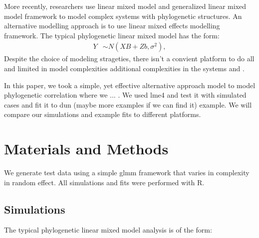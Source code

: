\documentclass[12pt]{article}
\begin{document}
More recently, researchers use linear mixed model and generalized linear mixed model framework to model complex systems with phylogenetic structures.
An alternative modelling approach is to use linear mixed effects modelling framework.
The typical phylogenetic linear mixed model has the form:
\begin{align}
Y & \sim N(XB + Zb, \sigma^{2}),
\end{align}
Despite the choice of modeling strageties, there isn't a convient platform to do all and limited in model complexities additional complexities in the systems and . 

In this paper, we took a simple, yet effective alternative approach model to model phylogenetic correlation where we ... . We used lme4 and test it with simulated cases and fit it to dun (maybe more examples if we can find it) example. 
We will compare our simulations and example fits to different platforms. 

\section{Materials and Methods}

We generate test data using a simple glmm framework that varies in complexity in random effect. All simulations and fits were performed with R. 

\subsection{Simulations}

The typical phylogenetic linear mixed model analysis is of the form:
\end{document}
